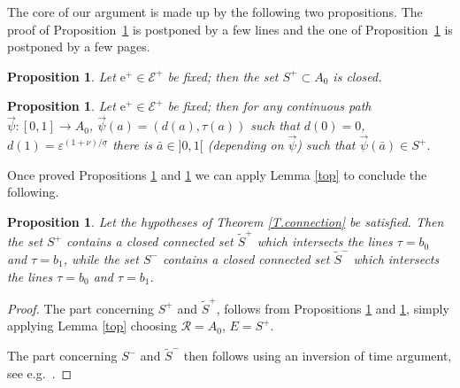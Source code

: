 \documentclass[10pt]{article}
\numberwithin{equation}{section}
\def\ep{\varepsilon}
\def\ee{{\mathrm e}}
\def\EE{{\mathcal E}}
\newtheorem{proposition}[theorem]{Proposition}
\theoremstyle{definition}
\theoremstyle{remark}
\begin{document}
The core of our argument is made up by the following two propositions.
The proof  of Proposition~\ref{Sclosed} is postponed by a few lines and the one of  Proposition~\ref{Sintersection} is postponed by a few
pages.
\begin{proposition}\label{Sclosed}
Let $\ee^+ \in \EE^+$ be fixed; then the set $S^+ \subset A_0$ is closed.
\end{proposition}
\begin{proposition}\label{Sintersection}
Let $\ee^+ \in \EE^+$ be fixed; then for any continuous path $\vec{\psi} : [0,1] \to A_0$, $\vec{\psi}(a)=(d(a),\tau(a))$ such that
$d(0)=0$, $d(1)=\ep^{(1+\nu)/\underline{\sigma}}$ there is
$\bar{a} \in ]0,1[$ (depending on $\vec{\psi}$) such that  $\vec{\psi}(\bar{a}) \in S^+$.
\end{proposition}
Once proved Propositions \ref{Sclosed} and \ref{Sintersection} we
can apply Lemma \ref{top}
to
conclude
the following.
\begin{proposition}\label{topological}
Let the hypotheses of Theorem \ref{T.connection} be satisfied.
Then the set $S^+$  contains a closed connected set $\tilde{S}^+$
which intersects the lines $\tau=b_0$ and $\tau=b_1$, while the set $S^-$  contains a closed connected set $\tilde{S}^-$
which intersects the lines $\tau=b_0$ and $\tau=b_1$.
\end{proposition}
\begin{proof}
  The part concerning $S^+$ and $\tilde{S}^+$, follows
 from   Propositions \ref{Sclosed} and \ref{Sintersection}, simply applying Lemma \ref{top}  choosing  $\mathcal{R}= A_0$, $E= S^+$.

 The part concerning  $S^-$ and $\tilde{S}^-$ then follows using an inversion of time argument, see e.g.\ \cite[\S 5.3]{CFPrestate}.
\end{proof}
\end{document}
